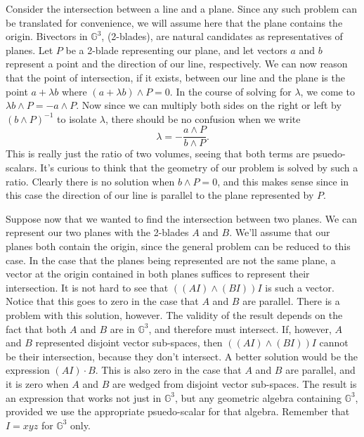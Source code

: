 \documentclass{article}
\newcommand{\G}{\mathbb{G}}
\begin{document}
Consider the intersection between a line and a plane.
Since any such problem can be translated for convenience, we will
assume here that the plane contains the origin.  Bivectors in $\G^3$,
(2-blades), are natural candidates as representatives of planes.
Let $P$ be a 2-blade representing our plane, and let vectors
$a$ and $b$ represent a point and the direction of our line, respectively.
We can now reason that the point of intersection, if it exists, between our line
and the plane is the point $a+\lambda b$ where
$(a+\lambda b)\wedge P=0$.  In the course of solving for $\lambda$,
we come to $\lambda b\wedge P = -a\wedge P$.  Now since we can
multiply both sides on the right or left by $(b\wedge P)^{-1}$
to isolate $\lambda$, there should be no confusion when we write
\begin{equation*}
\lambda = -\frac{a\wedge P}{b\wedge P}.
\end{equation*}
This is really just the ratio of two volumes, seeing that both
terms are psuedo-scalars.  It's curious to think that the geometry
of our problem is solved by such a ratio.  Clearly there is no
solution when $b\wedge P=0$, and this makes sense since in this
case the direction of our line is parallel to the plane represented
by $P$.

Suppose now that we wanted to find the intersection between two
planes.  We can represent our two planes with the 2-blades $A$ and $B$.
We'll assume that our planes both contain the origin, since the general
problem can be reduced to this case.  In the case that the planes being
represented are not the same plane, a vector at the origin contained in both planes
suffices to represent their intersection.  It is not hard to see
that $((AI)\wedge(BI))I$ is such a vector.  Notice that this goes
to zero in the case that $A$ and $B$ are parallel.  There is a problem
with this solution, however.  The validity of the result depends on
the fact that both $A$ and $B$ are in $\G^3$, and therefore must intersect.
If, however, $A$ and $B$ represented disjoint vector sub-spaces, then
$((AI)\wedge(BI))I$ cannot be their intersection, because they don't intersect.
A better solution would be the expression $(AI)\cdot B$.  This is also zero
in the case that $A$ and $B$ are parallel, and it is zero when $A$ and $B$
are wedged from disjoint vector sub-spaces.  The result is an expression
that works not just in $\G^3$, but any geometric algebra containing $\G^3$,
provided we use the appropriate psuedo-scalar for that algebra.  Remember
that $I=xyz$ for $\G^3$ only.
\end{document}
